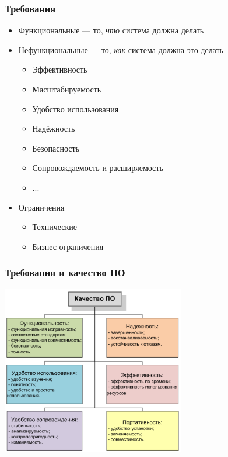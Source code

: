 \documentclass[xetex,mathserif,serif]{beamer}
\begin{document}
	\begin{frame}
		\frametitle{Требования}
		\begin{itemize}
			\item Функциональные --- то, \emph{что} система должна делать
			\item Нефункциональные --- то, \emph{как} система должна это делать
			\begin{itemize}
				\item Эффективность
				\item Масштабируемость
				\item Удобство использования
				\item Надёжность
				\item Безопасность
				\item Сопровождаемость и расширяемость
				\item ...
			\end{itemize}
			\item Ограничения
			\begin{itemize}
				\item Технические
				\item Бизнес-ограничения
			\end{itemize}
		\end{itemize}
	\end{frame}

	\begin{frame}
		\frametitle{Требования и качество ПО}
		\begin{center}
			\includegraphics[width=0.6\textwidth]{quality.png}
		\end{center}
	\end{frame}
\end{document}
